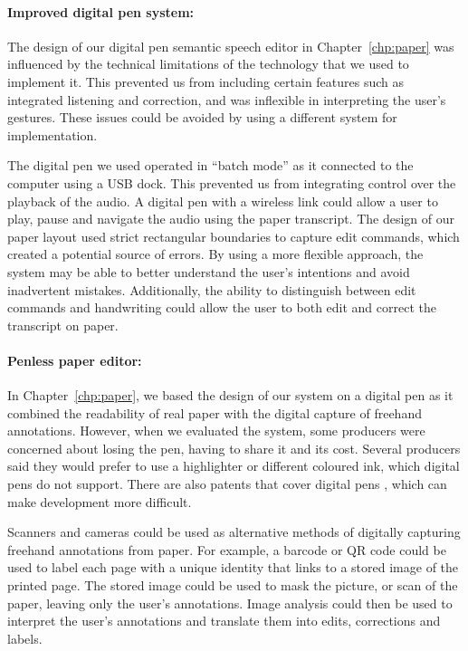 \paragraph{Improved digital pen system:}

The design of our digital pen semantic speech editor in Chapter~\ref{chp:paper} was influenced by the technical
limitations of the technology that we used to implement it.  This prevented us from including certain features such as
integrated listening and correction, and was inflexible in interpreting the user's gestures.  These issues could be
avoided by using a different system for implementation.

The digital pen we used operated in ``batch mode'' as it connected to the
computer using a USB dock. This prevented us from integrating control over the playback of the audio. A digital pen
with a wireless link could allow a user to play, pause and navigate the audio using the paper transcript.  The design
of our paper layout used strict rectangular boundaries to capture edit commands, which created a potential source of
errors. By using a more flexible approach, the system may be able to better understand the user's intentions and avoid
inadvertent mistakes.  Additionally, the ability to distinguish between edit commands and handwriting could allow the
user to both edit and correct the transcript on paper.

\paragraph{Penless paper editor:}

In Chapter~\ref{chp:paper}, we based the design of our system on a digital pen as it combined the readability of real
paper with the digital capture of freehand annotations. However, when we evaluated the system, some producers were
concerned about losing the pen, having to share it and its cost. Several producers said they would prefer to use a
highlighter or different coloured ink, which digital pens do not support. There are also patents that cover digital
pens \citep{Fahraeus2003}, which can make development more difficult.

Scanners and cameras could be used as alternative methods of digitally capturing freehand annotations from paper.  For
example, a barcode or QR code could be used to label each page with a unique identity that links to a stored image of
the printed page. The stored image could be used to mask the picture, or scan of the paper, leaving only the user's
annotations. Image analysis could then be used to interpret the user's annotations and translate them into edits,
corrections and labels.

